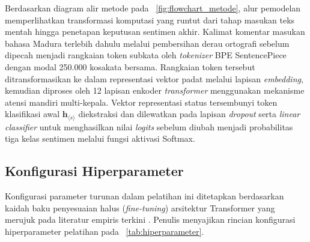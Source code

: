 Berdasarkan diagram alir metode pada \figurename~\ref{fig:flowchart_metode}, alur pemodelan memperlihatkan transformasi komputasi yang runtut dari tahap masukan teks mentah hingga penetapan keputusan sentimen akhir. Kalimat komentar masukan bahasa Madura terlebih dahulu melalui pembersihan derau ortografi sebelum dipecah menjadi rangkaian token subkata oleh \textit{tokenizer} BPE SentencePiece dengan modal 250.000 kosakata bersama. Rangkaian token tersebut ditransformasikan ke dalam representasi vektor padat melalui lapisan \textit{embedding}, kemudian diproses oleh 12 lapisan enkoder \textit{transformer} menggunakan mekanisme atensi mandiri multi-kepala. Vektor representasi status tersembunyi token klasifikasi awal $\mathbf{h}_{\langle s \rangle}$ diekstraksi dan dilewatkan pada lapisan \textit{dropout} serta \textit{linear classifier} untuk menghasilkan nilai \textit{logits} sebelum diubah menjadi probabilitas tiga kelas sentimen melalui fungsi aktivasi Softmax.

\subsection{Konfigurasi Hiperparameter}

Konfigurasi parameter turunan dalam pelatihan ini ditetapkan berdasarkan kaidah baku penyesuaian halus (\textit{fine-tuning}) arsitektur Transformer yang merujuk pada literatur empiris terkini \citep{darnoto2026language, luther2026analisis}. Penulis menyajikan rincian konfigurasi hiperparameter pelatihan pada \tablename~\ref{tab:hiperparameter}.

